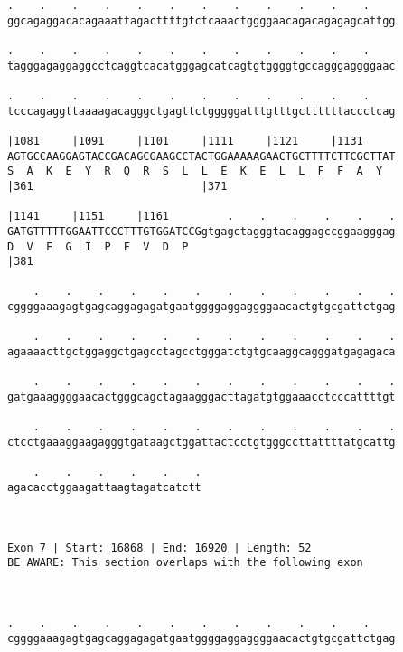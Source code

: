 \documentclass{article}
\begin{document}
\begin{Verbatim}
.    .    .    .    .    .    .    .    .    .    .    .    
ggcagaggacacagaaattagacttttgtctcaaactggggaacagacagagagcattgg
                                                            
.    .    .    .    .    .    .    .    .    .    .    .    
tagggagaggaggcctcaggtcacatgggagcatcagtgtggggtgccagggaggggaac
                                                            
.    .    .    .    .    .    .    .    .    .    .    .    
tcccagaggttaaaagacagggctgagttctgggggatttgtttgcttttttaccctcag
                                                            
|1081     |1091     |1101     |1111     |1121     |1131     
AGTGCCAAGGAGTACCGACAGCGAAGCCTACTGGAAAAAGAACTGCTTTTCTTCGCTTAT
S  A  K  E  Y  R  Q  R  S  L  L  E  K  E  L  L  F  F  A  Y  
|361                          |371                          
  
|1141     |1151     |1161         .    .    .    .    .    .
GATGTTTTTGGAATTCCCTTTGTGGATCCGgtgagctagggtacaggagccggaagggag
D  V  F  G  I  P  F  V  D  P                                
|381                                                        
  
    .    .    .    .    .    .    .    .    .    .    .    .
cggggaaagagtgagcaggagagatgaatggggaggaggggaacactgtgcgattctgag
                                                            
    .    .    .    .    .    .    .    .    .    .    .    .
agaaaacttgctggaggctgagcctagcctgggatctgtgcaaggcagggatgagagaca
                                                            
    .    .    .    .    .    .    .    .    .    .    .    .
gatgaaaggggaacactgggcagctagaagggacttagatgtggaaacctcccattttgt
                                                            
    .    .    .    .    .    .    .    .    .    .    .    .
ctcctgaaaggaagagggtgataagctggattactcctgtgggccttattttatgcattg
                                                            
    .    .    .    .    .    .
agacacctggaagattaagtagatcatctt
                              
                              
 
Exon 7 | Start: 16868 | End: 16920 | Length: 52
BE AWARE: This section overlaps with the following exon



.    .    .    .    .    .    .    .    .    .    .    .    
cggggaaagagtgagcaggagagatgaatggggaggaggggaacactgtgcgattctgag
                                                            

\end{Verbatim}
\end{document}
